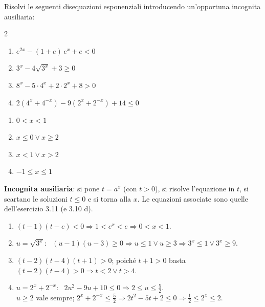 
\begin{question}[ID=5.10, subtitle={Disequazioni con sostituzione: radicali e grado superiore}, difficulty=difficile, tags={disequazioni, esponenziali, sostituzione}]
Risolvi le seguenti disequazioni esponenziali introducendo un'opportuna incognita ausiliaria:
\begin{center}\begin{minipage}{0.92\linewidth}
\begin{multicols}{2}
\begin{enumerate}[leftmargin=3.2cm]
\item $e^{2x} - (1+e)\,e^{x} + e < 0$
\item $3^{x} - 4\sqrt{3^{x}} + 3 \geq 0$
\item $8^{x} - 5 \cdot 4^{x} + 2 \cdot 2^{x} + 8 > 0$
\item $2\left(4^{x}+4^{-x}\right) - 9\left(2^{x}+2^{-x}\right) + 14 \leq 0$
\end{enumerate}
\end{multicols}
\end{minipage}\end{center}
\begin{solution}
\begin{enumerate}
    \item $0<x<1$
    \item $x\leq0\vee x\geq2$
    \item $x<1\vee x>2$
    \item $-1\leq x\leq1$
\end{enumerate}
\end{solution}
\begin{explanation}
\textbf{Incognita ausiliaria}: si pone $t=a^x$ (con $t>0$), si risolve l'equazione in $t$, si scartano le soluzioni $t\leq0$ e si torna alla $x$.
Le equazioni associate sono quelle dell'esercizio 3.11 (e 3.10 d).
\begin{enumerate}
    \item $(t-1)(t-e)<0 \Rightarrow 1<e^x<e \Rightarrow 0<x<1$.
    \item $u=\sqrt{3^x}$: \ $(u-1)(u-3)\geq0 \Rightarrow u\leq1 \vee u\geq3 \Rightarrow 3^x\leq1 \vee 3^x\geq9$.
    \item $(t-2)(t-4)(t+1)>0$; poiché $t+1>0$ basta $(t-2)(t-4)>0 \Rightarrow t<2 \vee t>4$.
    \item $u=2^x+2^{-x}$: \ $2u^2-9u+10\leq0 \Rightarrow 2\leq u\leq\tfrac52$. \\
    $u\geq2$ vale sempre; $2^x+2^{-x}\leq\tfrac52 \Rightarrow 2t^2-5t+2\leq0 \Rightarrow \tfrac12\leq2^x\leq2$.
\end{enumerate}
\end{explanation}
\end{question}

